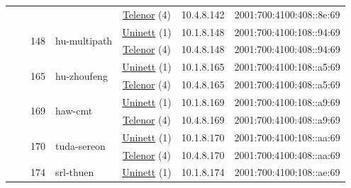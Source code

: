 \begin{small}
\begin{center}
\begin{longtable}{|c|c|c|c|c|c|c|c|}
  &  &  &  & \multicolumn{2}{|c|}{\tiny{\href{https://www.telenor.no}{Telenor} (4)}} & \tiny{10.4.8.142} & \tiny{2001:700:4100:408::8e:69} \\* \cline{3-3}\cline{4-4}\cline{5-5}\cline{6-6}\cline{7-7}\cline{8-8}
  &  & \multirow{2}{*}{\tiny{148}} & \multicolumn{1}{|l|}{\multirow{2}{*}{\tiny{hu-multipath}}} & \multicolumn{2}{|c|}{\tiny{\href{https://www.uninett.no}{Uninett} (1)}} & \tiny{10.1.8.148} & \tiny{2001:700:4100:108::94:69} \\* \cline{5-5}\cline{6-6}\cline{7-7}\cline{8-8}
  &  &  &  & \multicolumn{2}{|c|}{\tiny{\href{https://www.telenor.no}{Telenor} (4)}} & \tiny{10.4.8.148} & \tiny{2001:700:4100:408::94:69} \\* \cline{3-3}\cline{4-4}\cline{5-5}\cline{6-6}\cline{7-7}\cline{8-8}
  &  & \multirow{2}{*}{\tiny{165}} & \multicolumn{1}{|l|}{\multirow{2}{*}{\tiny{hu-zhoufeng}}} & \multicolumn{2}{|c|}{\tiny{\href{https://www.uninett.no}{Uninett} (1)}} & \tiny{10.1.8.165} & \tiny{2001:700:4100:108::a5:69} \\* \cline{5-5}\cline{6-6}\cline{7-7}\cline{8-8}
  &  &  &  & \multicolumn{2}{|c|}{\tiny{\href{https://www.telenor.no}{Telenor} (4)}} & \tiny{10.4.8.165} & \tiny{2001:700:4100:408::a5:69} \\* \cline{3-3}\cline{4-4}\cline{5-5}\cline{6-6}\cline{7-7}\cline{8-8}
  &  & \multirow{2}{*}{\tiny{169}} & \multicolumn{1}{|l|}{\multirow{2}{*}{\tiny{haw-cmt}}} & \multicolumn{2}{|c|}{\tiny{\href{https://www.uninett.no}{Uninett} (1)}} & \tiny{10.1.8.169} & \tiny{2001:700:4100:108::a9:69} \\* \cline{5-5}\cline{6-6}\cline{7-7}\cline{8-8}
  &  &  &  & \multicolumn{2}{|c|}{\tiny{\href{https://www.telenor.no}{Telenor} (4)}} & \tiny{10.4.8.169} & \tiny{2001:700:4100:408::a9:69} \\* \cline{3-3}\cline{4-4}\cline{5-5}\cline{6-6}\cline{7-7}\cline{8-8}
  &  & \multirow{2}{*}{\tiny{170}} & \multicolumn{1}{|l|}{\multirow{2}{*}{\tiny{tuda-sereon}}} & \multicolumn{2}{|c|}{\tiny{\href{https://www.uninett.no}{Uninett} (1)}} & \tiny{10.1.8.170} & \tiny{2001:700:4100:108::aa:69} \\* \cline{5-5}\cline{6-6}\cline{7-7}\cline{8-8}
  &  &  &  & \multicolumn{2}{|c|}{\tiny{\href{https://www.telenor.no}{Telenor} (4)}} & \tiny{10.4.8.170} & \tiny{2001:700:4100:408::aa:69} \\* \cline{3-3}\cline{4-4}\cline{5-5}\cline{6-6}\cline{7-7}\cline{8-8}
  &  & \multirow{2}{*}{\tiny{174}} & \multicolumn{1}{|l|}{\multirow{2}{*}{\tiny{srl-thuen}}} & \multicolumn{2}{|c|}{\tiny{\href{https://www.uninett.no}{Uninett} (1)}} & \tiny{10.1.8.174} & \tiny{2001:700:4100:108::ae:69} \\* \cline{5-5}\cline{6-6}\cline{7-7}\cline{8-8}

\end{longtable}
\end{center}
\end{small}
